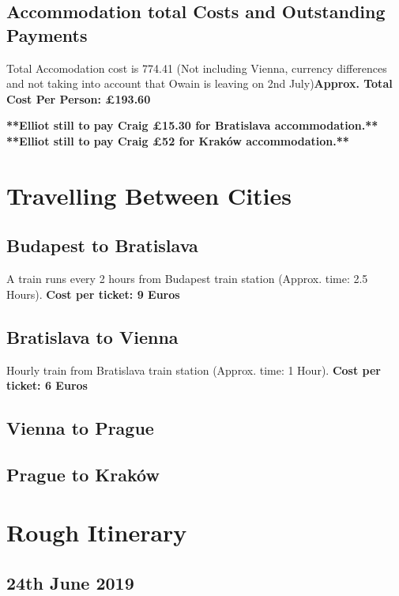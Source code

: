 \documentclass[a4paper,12pt]{article}
\begin{document}
    \subsection*{Accommodation total Costs and Outstanding Payments}
    Total Accomodation cost is  774.41 (Not including Vienna, currency differences and not taking into account that Owain is leaving on 2nd July)\textbf{Approx. Total Cost Per Person: £193.60 }\newline \newline
   
    \noindent \textbf{**Elliot still to pay Craig £15.30 for Bratislava accommodation.**}\newline
    \noindent \textbf{**Elliot still to pay Craig £52 for Kraków accommodation.**}\newline
   


\newpage

\section {Travelling Between Cities}
\subsection*{Budapest to Bratislava}
A train runs every 2 hours from Budapest train station (Approx. time: 2.5 Hours).\newline
 \textbf{Cost per ticket: 9 Euros}
 
\subsection*{Bratislava to Vienna}
Hourly train from Bratislava train station (Approx. time: 1 Hour).\newline
\textbf{Cost per ticket: 6 Euros}
\subsection*{Vienna to Prague}
\subsection*{Prague to Kraków}
\newpage

\section {Rough Itinerary}
\subsection*{24th June 2019} 
    
\end{document}
